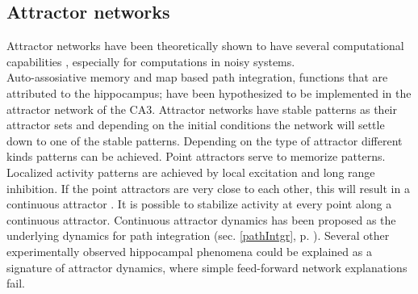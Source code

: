 



\subsection{Attractor networks}
Attractor networks have been theoretically shown to have several computational capabilities \cite{Amit1992}, especially for computations in noisy systems.\\
Auto-assosiative memory and map based path integration, functions that are attributed to the hippocampus; have been hypothesized to be implemented in the attractor network of the CA3. Attractor networks have stable patterns as their attractor sets and depending on the initial conditions the network will settle down to one of the stable patterns. Depending on the type of attractor different kinds patterns can be achieved. Point attractors serve to memorize patterns. Localized activity patterns are achieved by local excitation and long range inhibition. If the point attractors are very close to each other, this will result in a continuous attractor \cite{Trappenberg2003}. It is possible to stabilize activity at every point along a continuous attractor. Continuous attractor dynamics has been proposed as the underlying dynamics for path integration (sec. \ref{pathIntgr}, p. \pageref{pathIntgr}). Several other experimentally observed hippocampal phenomena could be explained as a signature of attractor dynamics, where simple feed-forward network explanations fail.\\

